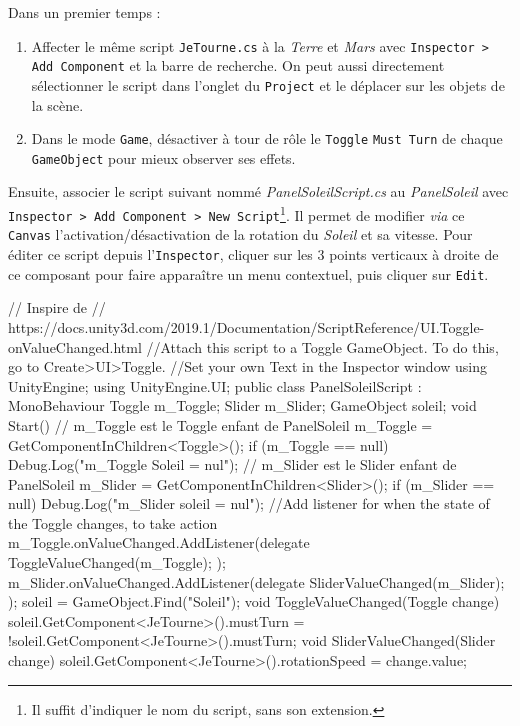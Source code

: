 \documentclass[a4paper,10pt]{article}
\newenvironment{solution}%
{\begin{tcolorbox}[breakable,colback=red!5!white,colframe=red!75!black,title=Solution]}%
{\end{tcolorbox}}
\newenvironment{boxcode}%
{\begin{tcolorbox}[breakable,colback=gray!5!white,colframe=black]}%
	{\end{tcolorbox}}
\begin{document}
\ifversionenseignant
\begin{solution}
Dans un premier temps :
\begin{enumerate}
	\item Affecter le même script \lstinline|JeTourne.cs| à la \textit{Terre} et \textit{Mars} avec \texttt{Inspector > Add Component} et la barre de recherche. On peut aussi directement sélectionner le script dans l'onglet du \texttt{Project} et le déplacer sur les objets de la scène.
	\item Dans le mode \texttt{Game}, désactiver à tour de rôle le \texttt{Toggle} \lstinline|Must Turn| de chaque \lstinline|GameObject| pour mieux observer ses effets.
\end{enumerate}	
	
Ensuite, associer le script suivant nommé \textit{PanelSoleilScript.cs} au \textit{PanelSoleil} avec \texttt{Inspector > Add Component > New Script}\footnote{Il suffit d'indiquer le nom du script, sans son extension.}. Il permet de modifier \textit{via} ce \texttt{Canvas} l'activation/désactivation de la rotation du \textit{Soleil} et sa vitesse. Pour éditer ce script depuis l'\texttt{Inspector}, cliquer sur les 3 points verticaux à droite de ce composant pour faire apparaître un menu contextuel, puis cliquer sur \texttt{Edit}.

\begin{boxcode}
	\begin{csharpsansbord}
// Inspire de
// https://docs.unity3d.com/2019.1/Documentation/ScriptReference/UI.Toggle-onValueChanged.html
//Attach this script to a Toggle GameObject. To do this, go to Create>UI>Toggle.
//Set your own Text in the Inspector window
using UnityEngine;
using UnityEngine.UI;
public class PanelSoleilScript : MonoBehaviour
{
	Toggle m_Toggle;
	Slider m_Slider;
	GameObject soleil;
	void Start()
	{
		// m_Toggle est le Toggle enfant de PanelSoleil
		m_Toggle = GetComponentInChildren<Toggle>();
		if (m_Toggle == null)
		Debug.Log("m_Toggle Soleil = nul");
		// m_Slider est le Slider enfant de PanelSoleil
		m_Slider = GetComponentInChildren<Slider>();
		if (m_Slider == null)
		Debug.Log("m_Slider soleil = nul");
		//Add listener for when the state of the Toggle changes, to take action
		m_Toggle.onValueChanged.AddListener(delegate {
			ToggleValueChanged(m_Toggle);
		});
		m_Slider.onValueChanged.AddListener(delegate {
			SliderValueChanged(m_Slider);
		});
		soleil = GameObject.Find("Soleil");
	}
	void ToggleValueChanged(Toggle change)
	{
		soleil.GetComponent<JeTourne>().mustTurn =
		 !soleil.GetComponent<JeTourne>().mustTurn;
	}
	void SliderValueChanged(Slider change)
	{
		soleil.GetComponent<JeTourne>().rotationSpeed = change.value;
	}
}	
\end{csharpsansbord}
\end{boxcode}



\end{solution}
\end{document}
